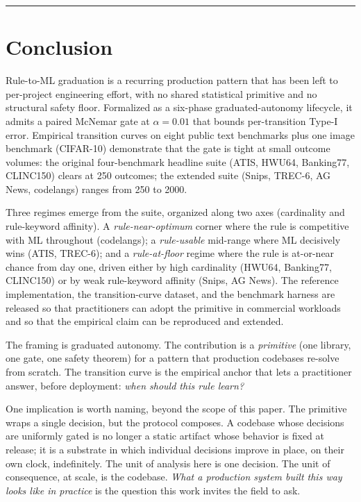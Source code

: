 \begin{center}\rule{0.5\linewidth}{0.5pt}\end{center}

\section{Conclusion}\label{conclusion}

Rule-to-ML graduation is a recurring production pattern that has been
left to per-project engineering effort, with no shared statistical
primitive and no structural safety floor. Formalized as a six-phase
graduated-autonomy lifecycle, it admits a paired McNemar gate at
\(\alpha = 0.01\) that bounds per-transition Type-I error. Empirical
transition curves on eight public text benchmarks plus one image
benchmark (CIFAR-10) demonstrate that the gate is tight at small outcome
volumes: the original four-benchmark headline suite (ATIS, HWU64,
Banking77, CLINC150) clears at 250 outcomes; the extended suite (Snips,
TREC-6, AG News, codelangs) ranges from 250 to 2000.

Three regimes emerge from the suite, organized along two axes
(cardinality and rule-keyword affinity). A \emph{rule-near-optimum}
corner where the rule is competitive with ML throughout (codelangs); a
\emph{rule-usable} mid-range where ML decisively wins (ATIS, TREC-6);
and a \emph{rule-at-floor} regime where the rule is at-or-near chance
from day one, driven either by high cardinality (HWU64, Banking77,
CLINC150) or by weak rule-keyword affinity (Snips, AG News). The
\sysname{} reference implementation, the transition-curve dataset, and the
benchmark harness are released so that practitioners can adopt the
primitive in commercial workloads and so that the empirical claim can be
reproduced and extended.

The framing is graduated autonomy. The contribution is a
\emph{primitive} (one library, one gate, one safety theorem) for a
pattern that production codebases re-solve from scratch. The transition
curve is the empirical anchor that lets a practitioner answer, before
deployment: \emph{when should this rule learn?}

One implication is worth naming, beyond the scope of this paper. The
primitive wraps a single decision, but the protocol composes. A codebase
whose decisions are uniformly gated is no longer a static artifact whose
behavior is fixed at release; it is a substrate in which individual
decisions improve in place, on their own clock, indefinitely. The unit
of analysis here is one decision. The unit of consequence, at scale, is
the codebase. \emph{What a production system built this way looks like
in practice} is the question this work invites the field to ask.

